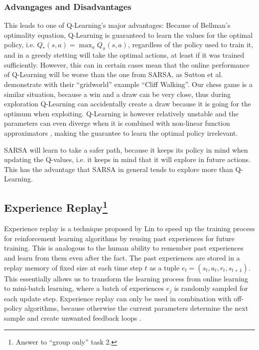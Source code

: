 \documentclass[conference]{IEEEtran}
\begin{document}
\subsubsection{Advangages and Disadvantages}
This leads to one of Q-Learning's major advantages: Because of Bellman's optimality equation, Q-Learning is guaranteed to learn the values for the optimal policy, i.e. $Q_*(s,a) = \max_\pi Q_\pi(s,a)$, regardless of the policy used to train it, and in a greedy stetting will take the optimal actions, at least if it was trained sufficiently. However, this can in certain cases mean that the online performance of Q-Learning will be worse than the one from SARSA, as Sutton et al. \cite{sutton2018} demonstrate with their ``gridworld'' example ``Cliff Walking''. Our chess game is a similar situation, because a win and a draw can be very close, thus during exploration Q-Learning can accidentally create a draw because it is going for the optimum when exploiting. Q-Learning is however relatively unstable and the parameters can even diverge when it is combined with non-linear function approximators \cite{dqn2015}, making the guarantee to learn the optimal policy irrelevant.

SARSA will learn to take a safer path, because it keeps its policy in mind when updating the Q-values, i.e. it keeps in mind that it will explore in future actions. This has the advantage that SARSA in general tends to explore more than Q-Learning.




\subsection{Experience Replay\footnote{Answer to ``group only'' task 2.}}


Experience replay is a technique proposed by Lin \cite{lin1992} to speed up the training process for reinforcement learning algorithms by reusing past experiences for future training. This is analogous to the human ability to remember past experiences and learn from them even after the fact. The past experiences are stored in a replay memory of fixed size at each time step $t$ as a tuple $e_t = (s_t, a_t, r_t, s_{t+1})$. 
This essentially allows us to transform the learning process from online learning to mini-batch learning, where a batch of experiences $e_j$ is randomly sampled for each update step. Experience replay can only be used in combination with off-policy algorithms, because otherwise the current parameters determine the next sample and create unwanted feedback loops \cite{atari2013,dqn2015}.
\end{document}
